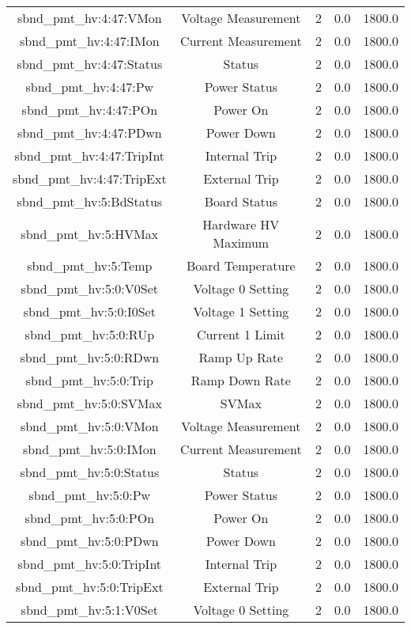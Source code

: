 \begin{center}
\begin{longtable}{c | c c c c }
sbnd\_pmt\_hv:4:47:VMon & Voltage Measurement & 2 & 0.0 & 1800.0\\ 
sbnd\_pmt\_hv:4:47:IMon & Current Measurement & 2 & 0.0 & 1800.0\\ 
sbnd\_pmt\_hv:4:47:Status & Status & 2 & 0.0 & 1800.0\\ 
sbnd\_pmt\_hv:4:47:Pw & Power Status & 2 & 0.0 & 1800.0\\ 
sbnd\_pmt\_hv:4:47:POn & Power On & 2 & 0.0 & 1800.0\\ 
sbnd\_pmt\_hv:4:47:PDwn & Power Down & 2 & 0.0 & 1800.0\\ 
sbnd\_pmt\_hv:4:47:TripInt & Internal Trip & 2 & 0.0 & 1800.0\\ 
sbnd\_pmt\_hv:4:47:TripExt & External Trip & 2 & 0.0 & 1800.0\\ 
sbnd\_pmt\_hv:5:BdStatus & Board Status & 2 & 0.0 & 1800.0\\ 
sbnd\_pmt\_hv:5:HVMax & Hardware HV Maximum & 2 & 0.0 & 1800.0\\ 
sbnd\_pmt\_hv:5:Temp & Board Temperature & 2 & 0.0 & 1800.0\\ 
sbnd\_pmt\_hv:5:0:V0Set & Voltage 0 Setting & 2 & 0.0 & 1800.0\\ 
sbnd\_pmt\_hv:5:0:I0Set & Voltage 1 Setting & 2 & 0.0 & 1800.0\\ 
sbnd\_pmt\_hv:5:0:RUp & Current 1 Limit & 2 & 0.0 & 1800.0\\ 
sbnd\_pmt\_hv:5:0:RDwn & Ramp Up Rate & 2 & 0.0 & 1800.0\\ 
sbnd\_pmt\_hv:5:0:Trip & Ramp Down Rate & 2 & 0.0 & 1800.0\\ 
sbnd\_pmt\_hv:5:0:SVMax & SVMax & 2 & 0.0 & 1800.0\\ 
sbnd\_pmt\_hv:5:0:VMon & Voltage Measurement & 2 & 0.0 & 1800.0\\ 
sbnd\_pmt\_hv:5:0:IMon & Current Measurement & 2 & 0.0 & 1800.0\\ 
sbnd\_pmt\_hv:5:0:Status & Status & 2 & 0.0 & 1800.0\\ 
sbnd\_pmt\_hv:5:0:Pw & Power Status & 2 & 0.0 & 1800.0\\ 
sbnd\_pmt\_hv:5:0:POn & Power On & 2 & 0.0 & 1800.0\\ 
sbnd\_pmt\_hv:5:0:PDwn & Power Down & 2 & 0.0 & 1800.0\\ 
sbnd\_pmt\_hv:5:0:TripInt & Internal Trip & 2 & 0.0 & 1800.0\\ 
sbnd\_pmt\_hv:5:0:TripExt & External Trip & 2 & 0.0 & 1800.0\\ 
sbnd\_pmt\_hv:5:1:V0Set & Voltage 0 Setting & 2 & 0.0 & 1800.0\\ 

\end{longtable}
\end{center}
